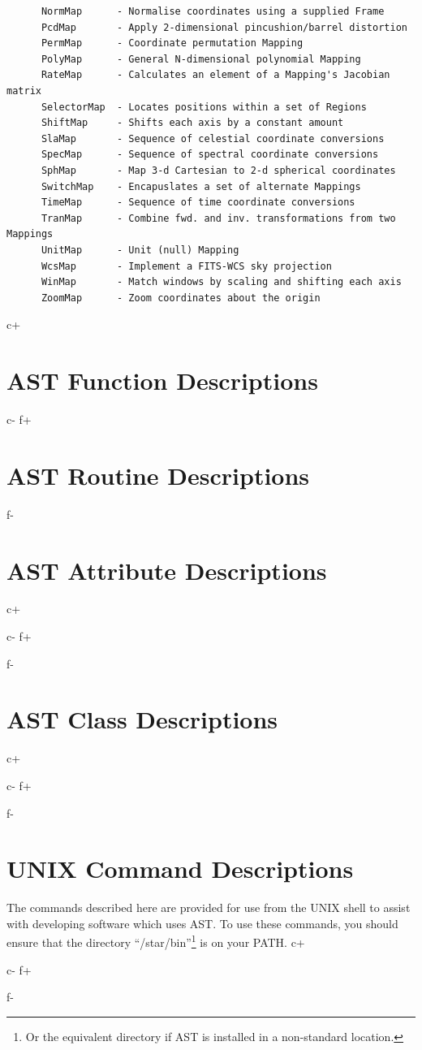 \documentclass[twoside,11pt]{article}
\begin{document}
\begin{verbatim}
      NormMap      - Normalise coordinates using a supplied Frame
      PcdMap       - Apply 2-dimensional pincushion/barrel distortion
      PermMap      - Coordinate permutation Mapping
      PolyMap      - General N-dimensional polynomial Mapping
      RateMap      - Calculates an element of a Mapping's Jacobian matrix 
      SelectorMap  - Locates positions within a set of Regions
      ShiftMap     - Shifts each axis by a constant amount
      SlaMap       - Sequence of celestial coordinate conversions
      SpecMap      - Sequence of spectral coordinate conversions
      SphMap       - Map 3-d Cartesian to 2-d spherical coordinates
      SwitchMap    - Encapuslates a set of alternate Mappings
      TimeMap      - Sequence of time coordinate conversions
      TranMap      - Combine fwd. and inv. transformations from two Mappings
      UnitMap      - Unit (null) Mapping
      WcsMap       - Implement a FITS-WCS sky projection
      WinMap       - Match windows by scaling and shifting each axis
      ZoomMap      - Zoom coordinates about the origin
\end{verbatim}
\normalsize

\cleardoublepage
c+
\section{\label{ss:functiondescriptions}AST Function Descriptions}
\small

\normalsize
c-
f+
\section{\label{ss:functiondescriptions}AST Routine Descriptions}
\small

\normalsize
f-

\cleardoublepage
\section{\label{ss:attributedescriptions}AST Attribute Descriptions}
\small
c+

c-
f+

f-
\normalsize

\cleardoublepage
\section{\label{ss:classdescriptions}AST Class Descriptions}
\small
c+

c-
f+

f-
\normalsize

\cleardoublepage
\section{\label{ss:commanddescriptions}UNIX Command Descriptions}
The commands described here are provided for use from the UNIX shell
to assist with developing software which uses AST. To use these
commands, you should ensure that the directory
``/star/bin''\footnote{Or the equivalent directory if AST is installed
in a non-standard location.} is on your PATH.
\small
c+

c-
f+

f-
\normalsize
\end{document}
